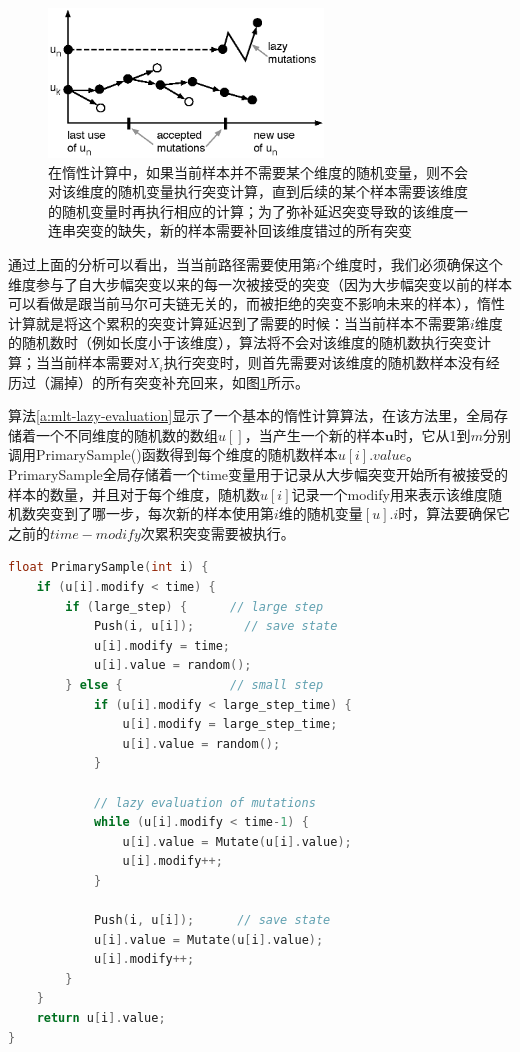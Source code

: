 \begin{figure}
	\sidecaption
	\includegraphics[width=0.65\textwidth]{figures/mlt/lazy}
	\caption{在惰性计算中，如果当前样本并不需要某个维度的随机变量，则不会对该维度的随机变量执行突变计算，直到后续的某个样本需要该维度的随机变量时再执行相应的计算；为了弥补延迟突变导致的该维度一连串突变的缺失，新的样本需要补回该维度错过的所有突变}
	\label{f:mlt-lazy}
\end{figure}

通过上面的分析可以看出，当当前路径需要使用第$i$个维度时，我们必须确保这个维度参与了自大步幅突变以来的每一次被接受的突变（因为大步幅突变以前的样本可以看做是跟当前马尔可夫链无关的，而被拒绝的突变不影响未来的样本），惰性计算就是将这个累积的突变计算延迟到了需要的时候：当当前样本不需要第$i$维度的随机数时（例如长度小于该维度），算法将不会对该维度的随机数执行突变计算；当当前样本需要对$X_i$执行突变时，则首先需要对该维度的随机数样本没有经历过（漏掉）的所有突变补充回来，如图\ref{f:mlt-lazy}所示。

算法\ref{a:mlt-lazy-evaluation}显示了一个基本的惰性计算算法，在该方法里，全局存储着一个不同维度的随机数的数组$u[]$，当产生一个新的样本$\mathbf{u}$时，它从1到$m$分别调用PrimarySample()函数得到每个维度的随机数样本$u[i].value$。PrimarySample全局存储着一个time变量用于记录从大步幅突变开始所有被接受的样本的数量，并且对于每个维度，随机数$u[i]$记录一个modify用来表示该维度随机数突变到了哪一步，每次新的样本使用第$i$维的随机变量$[u].i$时，算法要确保它之前的$time-modify$次累积突变需要被执行。

\begin{algorithm}
\begin{lstlisting}[language=C++, mathescape]
float PrimarySample(int i) { 
	if (u[i].modify < time) {
		if (large_step) {      // large step
			Push(i, u[i]);       // save state
			u[i].modify = time;
			u[i].value = random();
		} else {               // small step
			if (u[i].modify < large_step_time) {
				u[i].modify = large_step_time;
				u[i].value = random();
			}
			
			// lazy evaluation of mutations 
			while (u[i].modify < time-1) {
				u[i].value = Mutate(u[i].value);
				u[i].modify++;
			}
			
			Push(i, u[i]);      // save state
			u[i].value = Mutate(u[i].value);
			u[i].modify++;
		} 
	}
	return u[i].value;
}
\end{lstlisting}
\caption{获取每个原采样空间第$i$维的[0,1]随机变量的伪代码}
\label{a:mlt-lazy-evaluation}
\end{algorithm}

